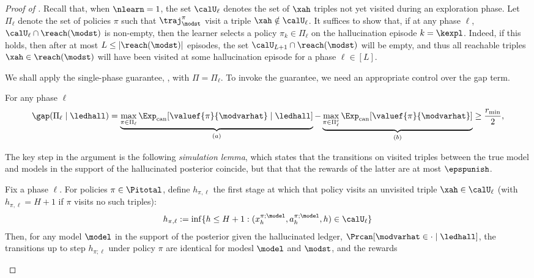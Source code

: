 \begin{proof}[Proof of ]
Recall that, when $\nlearn = 1$, the set $\calU_{\ell}$ denotes the set of $\xah$ triples not yet visited during an exploration phase.  Let $\Pi_{\ell}$ denote the set of policies $\pi$ such that $\traj^{\pi}_{\modst}$ visit a triple $\xah \notin \calU_{\ell}$. It suffices to show that, if at any phase $\ell$,   $\calU_{\ell} \cap \reach(\modst)$ is non-empty, then the learner selects a policy $\pi_k \in \Pi_{\ell}$ on the hallucination episode $k = \kexpl$. Indeed, if this holds, then after at most $L \le |\reach(\modst)|$ episodes, the set $\calU_{L+1}\cap\reach(\modst)$ will be empty, and thus all reachable triples $\xah \in \reach(\modst)$ will have been visited at some hallucination episode for a phase $\ell \in [L]$.


 We shall apply the single-phase guarantee, , with $\Pi = \Pi_{\ell}$.   To invoke the guarantee, we need an appropriate control over the gap term.
 \begin{claim}\label{claim:gap_size}For any phase $\ell$
  \begin{align}
 \gap(\Pi_{\ell} \mid \ledhall) = \underbrace{\max_{\pi \in \Pi_{\ell}}\Expcan[\valuef{\pi}{\modvarhat} \mid \ledhall]}_{(a)} - \underbrace{\max_{\pi \in \Pi_{\ell}^c}\Expcan[\valuef{\pi}{\modvarhat} ]}_{(b)} \ge \frac{r_{\min}}{2}, \label{eq:gap_det_wts}
 \end{align}
 \end{claim}
The key step in the argument is the following \emph{simulation lemma}, which states that the transitions on visited triples between the true model and models in the support of the hallucinated posterior coincide, but that that the rewards of the latter are at most $\epspunish$.
\begin{lemma}\label{claim:modclass_not} Fix a phase $\ell$. For policies $\pi \in \Pitotal$, define $h_{\pi,\ell} $ the first stage at which that policy visits an unvisited triple $\xah \in \calU_{\ell}$ (with $h_{\pi,\ell} = H+1$ if $\pi$ visits no such triples):
\begin{align}
h_{\pi,\ell} := \inf\{h \le H+1: (x_h^{\pi;\model},a_h^{\pi;\model},h) \in \calU_{\ell}\}
\end{align}
Then, for any model $\model$  in the support of the posterior given the hallucinated ledger, $\Prcan[\modvarhat  \in \cdot \mid \ledhall]$, the transitions up to step $h_{\pi;\ell}$ under policy $\pi$ are identical for modesl $\model$ and $\modst$, and the rewards

\end{lemma}
\end{proof}
